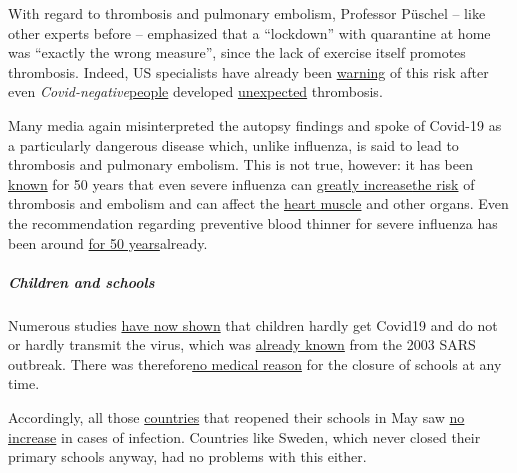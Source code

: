 With regard to thrombosis and pulmonary embolism, Professor Püschel --
like other experts before -- emphasized that a ``lockdown'' with
quarantine at home was ``exactly the wrong measure'', since the lack of
exercise itself promotes thrombosis. Indeed, US specialists have already
been
\href{https://twitter.com/AlexBerenson/status/1258625618431954945}{warning}
of this risk after even
\emph{Covid-negative}\href{https://twitter.com/AlexBerenson/status/1259548620724080640}{people}
developed
\href{https://twitter.com/AlexBerenson/status/1259634922161147910}{unexpected}
thrombosis.

Many media again misinterpreted the autopsy findings and spoke of
Covid-19 as a particularly dangerous disease which, unlike influenza, is
said to lead to thrombosis and pulmonary embolism. This is not true,
however: it has been
\href{https://www.thieme-connect.com/products/ejournals/abstract/10.1055/s-0028-1108874}{known}
for 50 years that even severe influenza can
\href{https://www.ejinme.com/article/S0953-6205(15)00284-8/pdf}{greatly
increase}\href{https://www.sciencedaily.com/releases/2009/10/091014111549.htm}{the
risk} of thrombosis and embolism and can affect the
\href{https://academic.oup.com/ije/article-abstract/7/3/231/755276}{heart
muscle} and other organs. Even the recommendation regarding preventive
blood thinner for severe influenza has been around
\href{https://www.thieme-connect.com/products/ejournals/abstract/10.1055/s-0028-1108874}{for
50 years}already.

\hypertarget{children-and-schools-1}{%
\subparagraph{\texorpdfstring{\textbf{Children and
schools}}{Children and schools}}\label{children-and-schools-1}}

Numerous studies
\href{https://thehill.com/opinion/education/500349-science-says-open-the-schools}{have
now shown} that children hardly get Covid19 and do not or hardly
transmit the virus, which was
\href{https://www.thelancet.com/journals/lanchi/article/PIIS2352-4642(20)30095-X/fulltext}{already
known} from the 2003 SARS outbreak. There was
therefore\href{https://infekt.ch/2020/04/schulen-schliessen-hilfreich-oder-nicht/}{no
medical reason} for the closure of schools at any time.

Accordingly, all those
\href{https://www.reuters.com/article/us-health-coronavirus-denmark-reopening/opening-schools-in-denmark-did-not-worsen-outbreak-data-shows-idUSKBN2341N7}{countries}
that reopened their schools in May saw
\href{https://www.cgdev.org/blog/back-school-tracking-covid-cases-schools-reopen}{no
increase} in cases of infection. Countries like Sweden, which never
closed their primary schools anyway, had no problems with this either.


